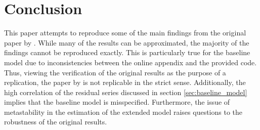 \section{Conclusion}
\label{sec:conclusion}

This paper attempts to reproduce some of the main findings from the original paper by \citeauthor{JERMANNfinancial}. While many of the results can be approximated, the majority of the findings cannot be reproduced exactly. This is particularly true for the baseline model due to inconsistencies between the online appendix and the provided code. Thus, viewing the verification of the original results as the purpose of a replication, the paper by \citeauthor{JERMANNfinancial} is not replicable in the strict sense. Additionally, the high correlation of the residual series discussed in section \ref{sec:baseline_model} implies that the baseline model is misspecified. Furthermore, the issue of metastability in the estimation of the extended model raises questions to the robustness of the original results.
